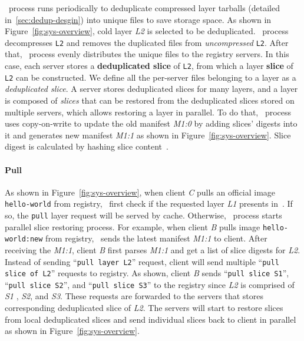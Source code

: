 \dedupname~process runs periodically to deduplicate compressed layer tarballs (detailed in~\cref{sec:dedup-desgin})
into unique files to save storage space.
As shown in Figure~\ref{fig:sys-overview}, cold layer \textit{L2} is selected to be deduplicated.
\dedupname~process decompresses \texttt{L2} and removes the duplicated files from \emph{uncompressed} \texttt{L2}.
After that, \dedupname~process evenly distributes the unique files to the registry servers.
In this case, each server stores a \textbf{deduplicated slice} of \texttt{L2}, from which a layer \textbf{slice} of \texttt{L2}
can be constructed.
We define all the per-server files belonging to a layer as a {\em deduplicated slice}. 
A server stores deduplicated slices for many layers, 
and a layer is composed of \emph{slices} 
that can be restored from the deduplicated slices stored on multiple servers, 
which allows restoring a layer in parallel. 
To do that, 
\dedupname~process uses copy-on-write to update the old manifest \textit{M1:0} by adding slices' digests into it 
and generates new manifest \textit{M1:1} as shown in Figure~\ref{fig:sys-overview}.
Slice digest is calculated by hashing slice content~\cite{xxx}.

\paragraph{Pull}

As shown in Figure~\ref{fig:sys-overview},
when client \textit{C} pulls an official image \texttt{hello-world} from registry,
\sysname~first check if the requested layer \textit{L1} presents in~\preconstructcachename.
If so, the \texttt{pull} layer request will be served by cache.
Otherwise, \dedupname~process starts parallel slice restoring process.
For example, when client \textit{B} pulls image \texttt{hello-world:new} from registry,
\sysname~sends the latest manifest \textit{M1:1} to client.
After receiving the \textit{M1:1}, client \textit{B} first parses \textit{M1:1} and get a list of slice digests for \textit{L2}.
Instead of sending ``\texttt{pull layer L2}'' request, client will send multiple ``\texttt{pull slice of L2}'' requests to registry.
As shown, client \textit{B} sends ``\texttt{pull slice S1}'', ``\texttt{pull slice S2}'', and 
``\texttt{pull slice S3}'' to the registry 
since \textit{L2} is comprised of \textit{S1} , \textit{S2}, and \textit{S3}.
These requests are forwarded to the servers that stores corresponding deduplicated slice of \textit{L2}.
The servers will start to restore slices from local deduplicated slices and send individual slices back to client 
in parallel as shown in Figure~\ref{fig:sys-overview}. 

